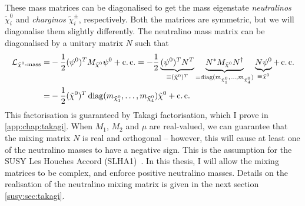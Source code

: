 \documentclass[../main.tex]{subfiles}
\begin{document}
These mass matrices can be diagonalised to get the mass eigenstate \emph{neutralinos} \(\tilde\chi^0_i\) and \emph{charginos} \(\tilde\chi^\pm_i\), respectively.
Both the matrices are symmetric, but we will diagonalise them slightly differently.
The neutralino mass matrix can be diagonalised by a unitary matrix \(N\) such that
\begin{align}
  \nonumber
  \mathcal{L}_{\tilde\chi^0\text{-mass}} = & -\frac{1}{2}(\psi^0)^T M_{\tilde\chi^0} \psi^0 + \operatorname{c.c.} = -\frac{1}{2} \underbrace{(\psi^0)^T N^T}_{\equiv (\tilde{\chi}^{0})^T} \underbrace{N^\ast M_{\tilde\chi^0} N^\dagger}_{= \operatorname{diag}(m_{\tilde\chi^0_1}, \ldots, m_{\tilde\chi^0_4})} \underbrace{N \psi^0}_{\equiv \tilde\chi^0} + \operatorname{c.c.} \\
  =                               & -\frac{1}{2} (\tilde\chi^0)^T \operatorname{diag}(m_{\tilde\chi^0_1}, \ldots, m_{\tilde\chi^0_4}) \tilde\chi^0 + \operatorname{c.c.}
\end{align}
This factorisation is guaranteed by Takagi factorisation, which I prove in \cref{app:chap:takagi}.
When \(M_1\), \(M_2\) and \(\mu\) are real-valued, we can guarantee that the mixing matrix \(N\) is real and orthogonal -- however, this will cause at least one of the neutralino masses to have a negative sign.
This is the assumption for the SUSY Les Houches Accord (SLHA1)~\cite{SLHA1}.
In this thesis, I will allow the mixing matrices to be complex, and enforce positive neutralino masses.
Details on the realisation of the neutralino mixing matrix is given in the next section \cref{susy:sec:takagi}.
\end{document}
